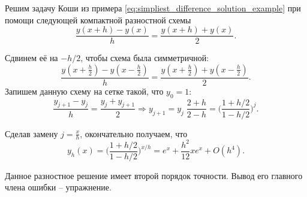 \documentclass[../main.tex]{subfile}
\begin{document}
\begin{example}
	Решим задачу Коши из примера
	\eqref{eq:simpliest_difference_solution_example} при помощи следующей
	компактной разностной схемы
	\[\frac{y(x+h)-y(x)}{h}=\frac{y(x+h)+y(x)}{2}.\]

	Сдвинем её на $-h/2$, чтобы схема была симметричной:
	\[\frac{y(x+\frac{h}{2})-y(x-\frac{h}{2})}{h}=\frac{y(x+\frac{h}{2})+
	y(x-\frac{h}{2})}{2}.\]
	Запишем данную схему на сетке такой, что $y_0=1$:
	\[\frac{y_{j+1}-y_j}{h}=\frac{y_j+y_{j+1}}{2}\Rightarrow
	y_{j+1}=y_j\;\frac{2+h}{2-h}=\Big(\frac{1+h/2}{1-h/2}\Big)^j.\]

	Сделав замену $j=\frac{x}{h}$, окончательно получаем, что
	\[y_h(x)=\Big(\frac{1+h/2}{1-h/2}\Big)^{x/h}=e^x+\frac{h^2}{12}xe^x+
	O(h^4).\]

	Данное разностное решение имеет второй порядок точности. Вывод
	его главного члена ошибки -- упражнение.
\end{example}
\end{document}
